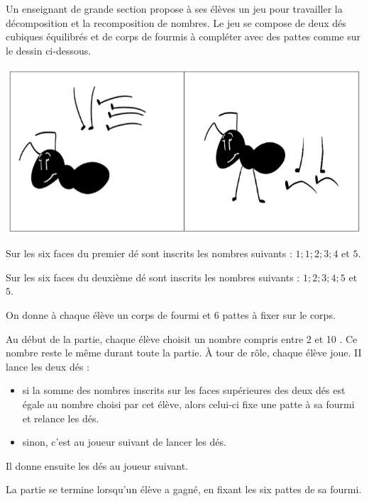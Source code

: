 
Un enseignant de grande section propose à ses élèves un jeu pour travailler la décomposition et la recomposition de nombres. Le jeu se compose de deux dés cubiques équilibrés et de corps de fourmis à compléter avec des pattes comme sur le dessin ci-dessous.

\begin{center}
	\includegraphics[width=.8\textwidth]{./images/2022-g2-ex1-img1.png}
\end{center}

Sur les six faces du premier dé sont inscrits les nombres suivants : $1 ; 1 ; 2 ; 3 ; 4$ et $5 .$

Sur les six faces du deuxième dé sont inscrits les nombres suivants : $1 ; 2 ; 3 ; 4 ; 5$ et $5 .$

On donne à chaque élève un corps de fourmi et 6 pattes à fixer sur le corps.

\medskip

Au début de la partie, chaque élève choisit un nombre compris entre 2 et 10 . Ce nombre reste le même durant toute la partie. À tour de rôle, chaque élève joue. II lance les deux dés :

\begin{itemize}
  \item si la somme des nombres inscrits sur les faces supérieures des deux dés est égale au nombre choisi par cet élève, alors celui-ci fixe une patte à sa fourmi et relance les dés.

  \item sinon, c'est au joueur suivant de lancer les dés.

\end{itemize}
Il donne ensuite les dés au joueur suivant.

La partie se termine lorsqu'un élève a gagné, en fixant les six pattes de sa fourmi.

